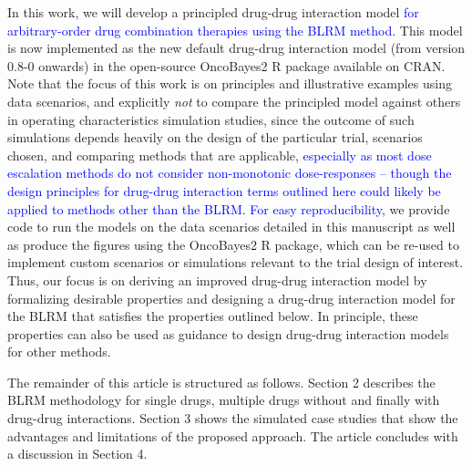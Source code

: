 \documentclass[AMA,STIX1COL]{WileyNJD-v2}
\newcommand{\revision}[1]{\textcolor{blue}{#1}}
\begin{document}
In this work, we will develop a principled drug-drug interaction model \revision{for arbitrary-order drug combination therapies using the BLRM method}. This model is now implemented as the new default drug-drug interaction model (from version 0.8-0 onwards) in the open-source OncoBayes2\cite{OncoBayes2} R package available on CRAN. Note that the focus of this work is on principles and illustrative examples using data scenarios, and explicitly \emph{not} to compare the principled model against others in operating characteristics simulation studies, since the outcome of such simulations depends heavily on the design of the particular trial, scenarios chosen, and comparing methods that are applicable, \revision{especially as most dose escalation methods do not consider non-monotonic dose-responses -- though the design principles for drug-drug interaction terms outlined here could likely be applied to methods other than the BLRM. For easy reproducibility,} we provide code to run the models on the data scenarios detailed in this manuscript as well as produce the figures using the OncoBayes2 R package, which can be re-used to implement custom scenarios or simulations relevant to the trial design of interest. Thus, our focus is on deriving an improved drug-drug interaction model by formalizing desirable properties and designing a drug-drug interaction model for the BLRM that satisfies the properties outlined below. In principle, these properties can also be used as guidance to design drug-drug interaction models for other methods.

The remainder of this article is structured as follows. Section 2 describes the BLRM methodology for single drugs, multiple drugs without and finally with drug-drug interactions. Section 3 shows the simulated case studies that show the advantages and limitations of the proposed approach. The article concludes with a discussion in Section 4.
\end{document}

